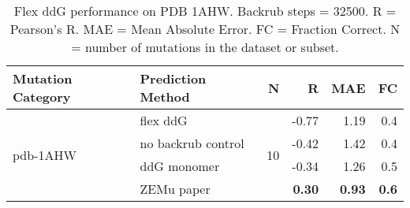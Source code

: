 \begin{table}
  \begin{tabular}{llrrrr}
\toprule
Mutation Category &   Prediction Method &   N &     R &  MAE &  FC \\
\midrule
 \multirow{ 4}{*}{pdb-1AHW} & flex ddG & \multirow{ 4}{*}{10} & -0.77 & 1.19 & 0.4  \\
 & no backrub control & & -0.42 & 1.42 & 0.4  \\
 & ddG monomer & & -0.34 & 1.26 & 0.5  \\
 & ZEMu paper & & \textbf{0.30} & \textbf{0.93} & \textbf{0.6}  \\
\bottomrule
\end{tabular}
  \caption[Flex ddG performance on PDB 1AHW]{
    Flex ddG performance on PDB 1AHW. Backrub steps = 32500. R = Pearson's R. MAE = Mean Absolute Error. FC = Fraction Correct. N = number of mutations in the dataset or subset.
  } \label{tab:table-pdb-1AHW}
\end{table}
